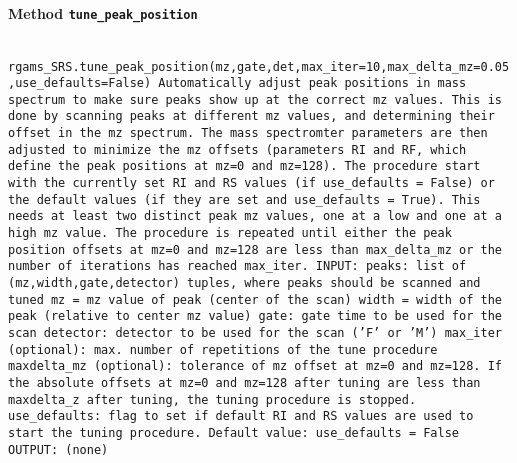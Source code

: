 \paragraph{Method \texttt{tune_peak_position}}
\vspace{1ex}
\texttt{\newline
rgams_SRS.tune_peak_position(mz,gate,det,max_iter=10,max_delta_mz=0.05,use_defaults=False)\newline
\newline
Automatically adjust peak positions in mass spectrum to make sure peaks show up at the correct mz values. This is done by scanning peaks at different mz values, and determining their offset in the mz spectrum. The mass spectromter parameters are then adjusted to minimize the mz offsets (parameters RI and RF, which define the peak positions at mz=0 and mz=128). The procedure start with the currently set RI and RS values (if use_defaults = False) or the default values (if they are set and use_defaults = True). This needs at least two distinct peak mz values, one at a low and one at a high mz value. The procedure is repeated until either the peak position offsets at mz=0 and mz=128 are less than max_delta_mz or the number of iterations has reached max_iter.\newline
\newline
INPUT:\newline
peaks: list of (mz,width,gate,detector) tuples, where peaks should be scanned and tuned\newline
mz = mz value of peak (center of the scan)\newline
width = width of the peak (relative to center mz value)\newline
gate: gate time to be used for the scan\newline
detector: detector to be used for the scan ('F' or 'M')\newline
max_iter (optional): max. number of repetitions of the tune procedure\newline
maxdelta_mz (optional): tolerance of mz offset at mz=0 and mz=128. If the absolute offsets at mz=0 and mz=128 after tuning are less than maxdelta_z after tuning, the tuning procedure is stopped.\newline
use_defaults: flag to set if default RI and RS values are used to start the tuning procedure. Default value: use_defaults = False\newline
\newline
OUTPUT:\newline
(none)\newline
}
